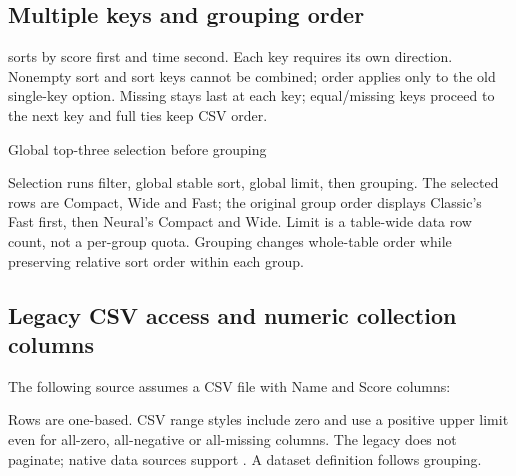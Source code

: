 \subsection{Multiple keys and grouping order}
\begin{sloppypar}
 sorts by score first and time
second. Each key requires its own direction. Nonempty sort and sort keys cannot
be combined; order applies only to the old single-key option. Missing stays last
at each key; equal/missing keys proceed to the next key and full ties keep CSV order.
\end{sloppypar}
\begin{demo}{Global top-three selection before grouping}
\begin{gradtable}[data=families,width=\linewidth,
  sort keys={score/descending,time/ascending},limit=3,group by=family,header align=c]
\end{gradtable}
\end{demo}
Selection runs filter, global stable sort, global limit, then grouping.
The selected rows are Compact, Wide and Fast; the original group order displays
Classic's Fast first, then Neural's Compact and Wide. Limit is a table-wide data
row count, not a per-group quota. Grouping changes whole-table order while
preserving relative sort order within each group.

\subsection{Legacy CSV access and numeric collection columns}

The following source assumes a CSV file with Name and Score columns:
\begin{source}
\end{source}
Rows are one-based. CSV range styles include zero and use a positive upper limit
even for all-zero, all-negative or all-missing columns. The legacy 
does not paginate; native  data sources support . A dataset definition follows grouping.

